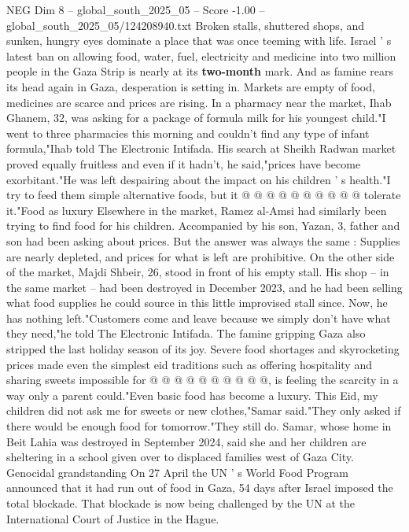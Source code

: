 \begin{textsample}{NEG Dim 8 – global\_south\_2025\_05 – Score -1.00 – global\_south\_2025\_05/124208940.txt}  \label{ex:f8_neg_014}
Broken stalls, shuttered shops, and sunken, hungry eyes dominate a place that was once teeming with life.
Israel ' s latest ban on allowing food, water, fuel, electricity and medicine into two million people in the Gaza Strip is nearly at its \textbf{two-month} mark.
And as famine rears its head again in Gaza, desperation is setting in.
Markets are empty of food, medicines are scarce and prices are rising.
In a pharmacy near the market, Ihab Ghanem, 32, was asking for a package of formula milk for his youngest child."I went to three pharmacies this morning and couldn't find any type of infant formula,"Ihab told The Electronic Intifada.
His search at Sheikh Radwan market proved equally fruitless and even if it hadn't, he said,"prices have become exorbitant."He was left despairing about the impact on his children ' s health."I try to feed them simple alternative foods, but it @ @ @ @ @ @ @ @ @ @ tolerate it."Food as luxury Elsewhere in the market, Ramez al-Amsi had similarly been trying to find food for his children.
Accompanied by his son, Yazan, 3, father and son had been asking about prices.
But the answer was always the same : Supplies are nearly depleted, and prices for what is left are prohibitive.
On the other side of the market, Majdi Shbeir, 26, stood in front of his empty stall.
His shop -- in the same market -- had been destroyed in December 2023, and he had been selling what food supplies he could source in this little improvised stall since.
Now, he has nothing left."Customers come and leave because we simply don't have what they need,"he told The Electronic Intifada.
The famine gripping Gaza also stripped the last holiday season of its joy.
Severe food shortages and skyrocketing prices made even the simplest eid traditions such as offering hospitality and sharing sweets impossible for @ @ @ @ @ @ @ @ @ @, is feeling the scarcity in a way only a parent could."Even basic food has become a luxury.
This Eid, my children did not ask me for sweets or new clothes,"Samar said."They only asked if there would be enough food for tomorrow."They still do.
Samar, whose home in Beit Lahia was destroyed in September 2024, said she and her children are sheltering in a school given over to displaced families west of Gaza City.
Genocidal grandstanding On 27 April the UN ' s World Food Program announced that it had run out of food in Gaza, 54 days after Israel imposed the total blockade.
That blockade is now being challenged by the UN at the International Court of Justice in the Hague.

\end{textsample}
